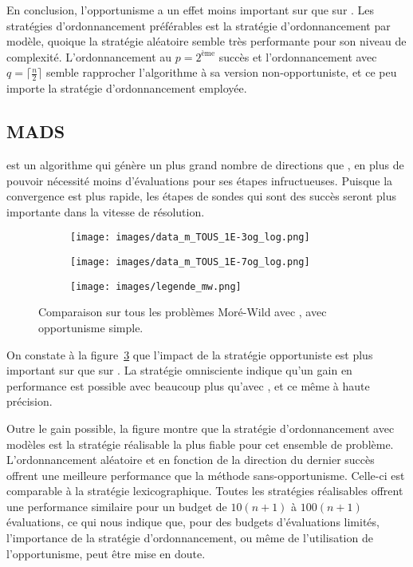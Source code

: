 En conclusion, l'opportunisme a un effet moins important sur \GPS que sur \CS. Les stratégies d'ordonnancement préférables est la stratégie d'ordonnancement par modèle, quoique la stratégie aléatoire semble très performante pour son niveau de complexité. L'ordonnancement au $p=2^{\text{ème}}$ succès et l'ordonnancement avec $q=\lceil\frac{n}{2}\rceil$ semble rapprocher l'algorithme à sa version non-opportuniste, et ce peu importe la stratégie d'ordonnancement employée.
\subsection{MADS}\label{sec:cma}
\MADS est un algorithme qui génère un plus grand nombre de directions que \GPS, en plus de pouvoir nécessité moins d'évaluations pour ses étapes infructueuses. Puisque la convergence est plus rapide, les étapes de sondes qui sont des succès seront plus importante dans la vitesse de résolution.
\begin{figure}[!htb]
	\centering
	\begin{subfigure}{0.43\textwidth}
		\texttt{[image: images/data\_m\_TOUS\_1E-3og\_log.png]}
		\label{fig:data_m_TOUS_1E-3og_log}
	\end{subfigure}%
	\begin{subfigure}{0.43\textwidth}
		\texttt{[image: images/data\_m\_TOUS\_1E-7og\_log.png]}
		\label{fig:data_m_TOUS_1E-7og_log}
	\end{subfigure}
	\smallskip
	\begin{subfigure}{0.95\textwidth}
		\texttt{[image: images/legende\_mw.png]}
	\end{subfigure}
	\caption{Comparaison sur tous les problèmes Moré-Wild avec \MADS, avec opportunisme simple.}
	\label{fig:mads_mw}
\end{figure}
On constate à la figure~\ref{fig:mads_mw} que l'impact de la stratégie opportuniste est plus important sur \MADS que sur \GPS. La stratégie omnisciente indique qu'un gain en performance est possible avec \MADS beaucoup plus qu'avec \GPS, et ce même à haute précision. 

Outre le gain possible, la figure montre que la stratégie d'ordonnancement avec modèles est la stratégie réalisable la plus fiable pour cet ensemble de problème. L'ordonnancement aléatoire et en fonction de la direction du dernier succès offrent une meilleure performance que la méthode sans-opportunisme. Celle-ci est comparable à la stratégie lexicographique. Toutes les stratégies réalisables offrent une performance similaire pour un budget de $10(n+1)$ à $100(n+1)$ évaluations, ce qui nous indique que, pour des budgets d'évaluations limités, l'importance de la stratégie d'ordonnancement, ou même de l'utilisation de l'opportunisme, peut être mise en doute. 

